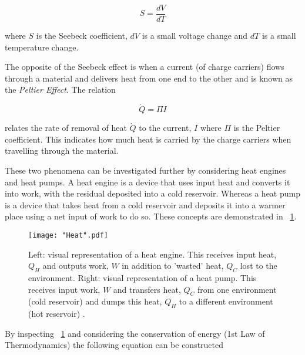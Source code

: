 \documentclass{article}
\newcommand{\figref}[2][\figurename~]{#1\ref{#2}}
\begin{document}
\begin{equation}
\label{eq:Seebeck-coeff}
S = \frac{dV}{dT}
\end{equation}

\vspace{2mm}
\noindent
where $S$ is the Seebeck coefficient, $dV$ is a small voltage change and $dT$ is a small temperature change. 

\vspace{2mm}
\noindent
The opposite of the Seebeck effect is when a current (of charge carriers) flows through a material and delivers heat from one end to the other and is known as the \textit{Peltier Effect}. The relation

\begin{equation}
\label{eq:Peltier-coeff}
\dot{Q}  = \Pi I
\end{equation}

\vspace{2mm}
\noindent
relates the rate of removal of heat $\dot{Q}$ to the current, $I$ \cite{Paper02} where $\Pi$ is the Peltier coefficient. This indicates how much heat is carried by the charge carriers when travelling through the material.

\vspace{2mm}
\noindent
These two phenomena can be investigated further by considering heat engines and heat pumps. A heat engine is a device that uses input heat and converts it into work, with the residual deposited into a cold reservoir. Whereas a heat pump is a device that takes heat from a cold reservoir and deposits it into a warmer place using a net input of work to do so. These concepts are demonstrated in \figref{fig:Heat}.

\begin{figure}[h]
\centering
\texttt{[image: "Heat".pdf]}
\caption{Left: visual representation of a heat engine. This receives input heat, $Q_H$ and outputs work, $W$ in addition to 'wasted' heat, $Q_C$ lost to the environment. Right: visual representation of a heat pump. This receives input work, $W$ and transfers heat, $Q_C$ from one environment (cold reservoir) and dumps this heat, $Q_H$ to a different environment (hot reservoir) \cite{Paper02}.}
\label{fig:Heat}
\end{figure}

\vspace{2mm}
\noindent
By inspecting \figref{fig:Heat} and considering the conservation of energy (1st Law of Thermodynamics) \cite{Paper02} the following equation can be constructed
\end{document}
